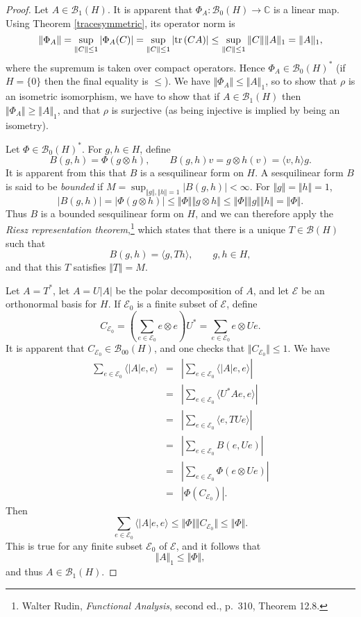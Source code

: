\documentclass{article}
\newcommand{\inner}[2]{\langle #1, #2 \rangle}
\newcommand{\tr}{\ensuremath\mathrm{tr}\,}
\newcommand{\norm}[1]{\Vert #1 \Vert}
\begin{document}
\begin{proof}
Let $A \in \mathscr{B}_1(H)$. It is apparent that $\Phi_A:\mathscr{B}_0(H) \to \mathbb{C}$ is a linear map. Using Theorem \ref{tracesymmetric}, its operator norm is
\[
\norm{\Phi_A} = \sup_{\norm{C} \leq 1} |\Phi_A(C)| = \sup_{\norm{C} \leq 1} |\tr(CA)| \leq \sup_{\norm{C} \leq 1} \norm{C} \norm{A}_1
=\norm{A}_1,
\]
where the supremum is taken
over compact operators. Hence $\Phi_A \in \mathscr{B}_0(H)^*$ (if $H=\{0\}$ then the final equality is $\leq$). We have $\norm{\Phi_A} \leq \norm{A}_1$, so to show that $\rho$ is an isometric isomorphism, we have to show
that if $A \in \mathscr{B}_1(H)$ then $\norm{\Phi_A} \geq \norm{A}_1$, and that $\rho$ is surjective (as being injective is implied by being an isometry).

Let $\Phi \in \mathscr{B}_0(H)^*$. For $g,h \in H$, define
\[
B(g,h)=\Phi(g \otimes h), \qquad B(g,h)v=g \otimes h (v)=\inner{v}{h}g.
\]
It is apparent from this that $B$ is a sesquilinear form on $H$. A sesquilinear form $B$ is said to be {\em bounded} if
$M = \sup_{\norm{g}, \norm{h} =1} |B(g,h)| < \infty$.
For $\norm{g}=\norm{h}=1$,
\[
|B(g,h)| = |\Phi(g \otimes h)| \leq \norm{\Phi} \norm{g \otimes h} \leq \norm{\Phi} \norm{g} \norm{h}=\norm{\Phi}.
\]
Thus $B$ is a bounded sesquilinear form on $H$, and we can therefore apply
the {\em Riesz representation theorem},\footnote{Walter Rudin,
{\em Functional Analysis}, second ed., p.~310, Theorem 12.8.} which states that there is a unique $T \in \mathscr{B}(H)$ such that 
\[
B(g,h)=\inner{g}{Th}, \qquad g,h \in H,
\]
and that this $T$ satisfies $\norm{T}=M$.

Let $A=T^*$,  let
 $A=U|A|$ be the polar decomposition of $A$, and let $\mathscr{E}$ be an orthonormal basis for $H$. If $\mathscr{E}_0$ is a finite subset of $\mathscr{E}$,
define
\[
C_{\mathscr{E}_0} = \left( \sum_{e \in \mathscr{E}_0} e \otimes e \right) U^*= \sum_{e \in \mathscr{E}_0} e \otimes Ue.
\]
It is apparent that $C_{\mathscr{E}_0} \in \mathscr{B}_{00}(H)$, and one checks that $\norm{C_{\mathscr{E}_0}} \leq 1$. 
We have
\begin{eqnarray*}
\sum_{e \in \mathscr{E}_0} \inner{|A|e}{e}&=&\left| \sum_{e \in \mathscr{E}_0} \inner{|A|e}{e} \right|\\
&=&\left| \sum_{e \in \mathscr{E}_0} \inner{U^*Ae}{e} \right|\\
&=&\left| \sum_{e \in \mathscr{E}_0} \inner{e}{TUe} \right|\\
&=&\left| \sum_{e \in \mathscr{E}_0} B(e,Ue) \right|\\
&=&\left| \sum_{e \in \mathscr{E}_0} \Phi(e \otimes Ue) \right|\\
&=&\left| \Phi (C_{\mathscr{E}_0}) \right|.
\end{eqnarray*}
Then
\[
\sum_{e \in \mathscr{E}_0} \inner{|A|e}{e} \leq \norm{\Phi} \norm{C_{\mathscr{E}_0}} \leq \norm{\Phi}.
\]
This is true for any finite subset $\mathscr{E}_0$ of $\mathscr{E}$, and it follows that
\begin{equation}
\norm{A}_1 \leq \norm{\Phi},
\label{norminequality}
\end{equation}
and thus $A \in \mathscr{B}_1(H)$.


\end{proof}
\end{document}
